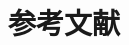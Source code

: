 \documentclass[submit,techreq]{ec2014}
\def\|{\verb|}
\begin{document}
\section{参考文献}





%\pagebreak%%!!!
%\vspace*{-\baselineskip}%%!!!

%\appendix
%7
%\section{付録の書き方}

%付録がある場合には，参考文献リストの直後にコマンド \|\appendix| に引き続





\end{document}
